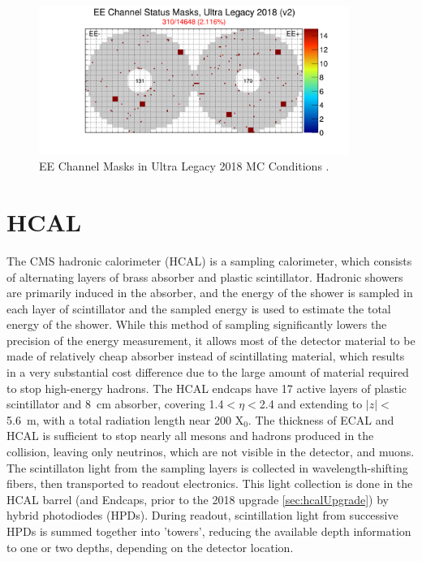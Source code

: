 \begin{figure}[h]
    \includegraphics[width=0.9\textwidth]{figures/EEChannelMasks.png}
    \centering
    \caption{EE Channel Masks in Ultra Legacy 2018 MC Conditions \cite{EcalDPG}.}
    \label{fig:EEmasks}
\end{figure}

\section{HCAL}
The CMS hadronic calorimeter (HCAL) is a sampling calorimeter, which consists of alternating layers of brass absorber and plastic scintillator. 
Hadronic showers are primarily induced in the absorber, and the energy of the shower is sampled in each layer of scintillator and the sampled energy is used to estimate the total energy of the shower. 
While this method of sampling significantly lowers the precision of the energy measurement, it allows most of the detector material to be made of relatively cheap absorber instead of scintillating material, which results in a very substantial cost difference due to the large amount of material required to stop high-energy hadrons.
The HCAL endcaps have 17 active layers of plastic scintillator and \SI{8}{\centi\meter} absorber, covering 1.4$<\eta<$2.4 and extending to $\lvert z \rvert<$ \SI{5.6}{\meter}, with a total radiation length near 200 X$_0$. 
The thickness of ECAL and HCAL is sufficient to stop nearly all mesons and hadrons produced in the collision, leaving only neutrinos, which are not visible in the detector, and muons. 
The scintillaton light from the sampling layers is collected in wavelength-shifting fibers, then transported to readout electronics.
This light collection is done in the HCAL barrel (and Endcaps, prior to the 2018 upgrade \cref{sec:hcalUpgrade}) by hybrid photodiodes (HPDs). 
During readout, scintillation light from successive HPDs is summed together into 'towers', reducing the available depth information to one or two depths, depending on the detector location.

